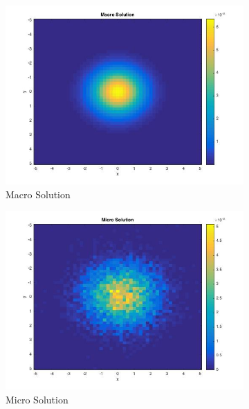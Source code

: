 \documentclass[10pt, margins = .5in]{article}
\begin{document}
\begin{figure}[H]
\begin{subfigure}{.5\linewidth}
\centering
\includegraphics[scale = .40]{MacroPlot.jpg}
\caption{Macro Solution}
\label{fig:macroPlot}
\end{subfigure}%
\begin{subfigure}{.40\linewidth}
\centering
\includegraphics[scale = .40]{MicroPlot.jpg}
\caption{Micro Solution}
\label{fig:microPlot}
\end{subfigure}\\[1ex]
\centering
\begin{subfigure}{.45\linewidth}

\end{subfigure}
\end{figure}
\end{document}
